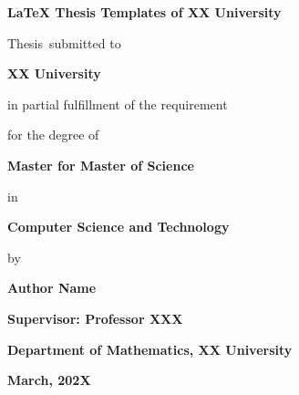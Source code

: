 \documentclass[a4paper,zihao=-4]{ctexart}
\begin{document}
\begin{center}

\vspace*{3.6\baselineskip}

\parbox[t]{\linewidth}{\centering\fontsize{20bp}{26bp}\selectfont\bfseries\sffamily%
\LaTeX{} Thesis Templates of XX University}

\vspace*{2.5\baselineskip}

\fontsize{16bp}{22bp}\selectfont
Thesis~submitted to

{\bfseries XX University}

in partial fulfillment of the requirement

for the degree of

{\bfseries Master for Master of Science}

in

{\bfseries Computer Science and Technology}

\vspace*{0.5\baselineskip}

by

{\bfseries Author Name}

{\bfseries Supervisor: Professor XXX}

\vspace*{2.0\baselineskip}

{\bfseries Department of Mathematics, XX University}

\vspace*{0.5\baselineskip}

{\bfseries March, 202X}

\end{center}
\end{document}
